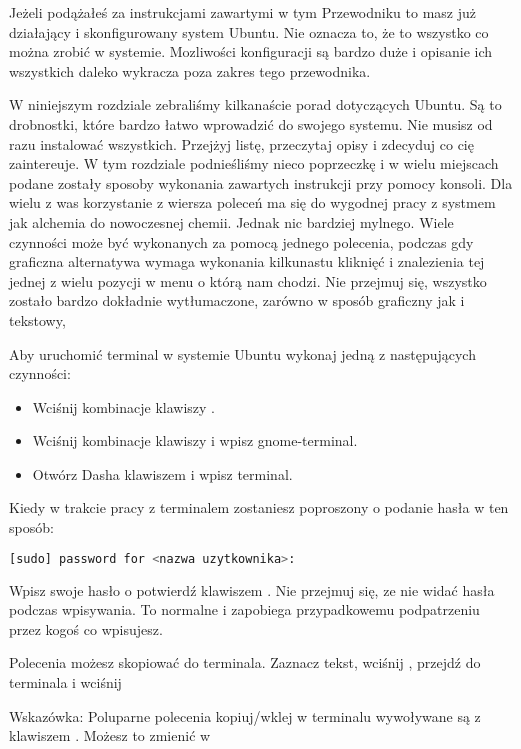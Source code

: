 Jeżeli podążałeś za instrukcjami zawartymi w tym Przewodniku to masz już działający i skonfigurowany system Ubuntu. Nie oznacza to, że to wszystko co można zrobić w systemie. Mozliwości konfiguracji są bardzo duże i opisanie ich wszystkich daleko wykracza poza zakres tego przewodnika.

W niniejszym rozdziale zebraliśmy kilkanaście porad dotyczących Ubuntu. Są to drobnostki, które bardzo łatwo wprowadzić do swojego systemu. Nie musisz od razu instalować wszystkich. Przejżyj listę, przeczytaj opisy i zdecyduj co cię zaintereuje. W tym rozdziale podnieśliśmy nieco poprzeczkę i w wielu miejscach podane zostały sposoby wykonania zawartych instrukcji przy pomocy konsoli. Dla wielu z was korzystanie z wiersza poleceń ma się do wygodnej pracy z systmem jak alchemia do nowoczesnej chemii. Jednak nic bardziej mylnego. Wiele czynności może być wykonanych za pomocą jednego polecenia, podczas gdy graficzna alternatywa wymaga wykonania kilkunastu kliknięć i znalezienia tej jednej z wielu pozycji w menu o którą nam chodzi. Nie przejmuj się, wszystko zostało bardzo dokładnie wytłumaczone, zarówno w sposób graficzny jak i tekstowy,

Aby uruchomić terminal w systemie Ubuntu wykonaj jedną z następujących czynności:
\begin{itemize}
\item Wciśnij kombinacje klawiszy .
\item Wciśnij kombinacje klawiszy  i wpisz \textcolor{ubuntu_orange}{gnome-terminal}.
\item Otwórz Dasha klawiszem  i wpisz \textcolor{ubuntu_orange}{terminal}.
\end{itemize}
\clearpage
Kiedy w trakcie pracy z terminalem zostaniesz poproszony o podanie hasła w ten sposób:
\begin{lstlisting}[language=bash]
[sudo] password for <nazwa uzytkownika>:
\end{lstlisting}
\noindent Wpisz swoje hasło o potwierdź klawiszem \keys{\returnwin}. Nie przejmuj się, ze nie widać hasła podczas wpisywania. To normalne i zapobiega przypadkowemu podpatrzeniu przez kogoś co wpisujesz.

Polecenia możesz skopiować do terminala. Zaznacz tekst, wciśnij , przejdź do terminala i wciśnij 

Wskazówka: Poluparne polecenia kopiuj/wklej w terminalu wywoływane są z klawiszem . Możesz to zmienić w 
